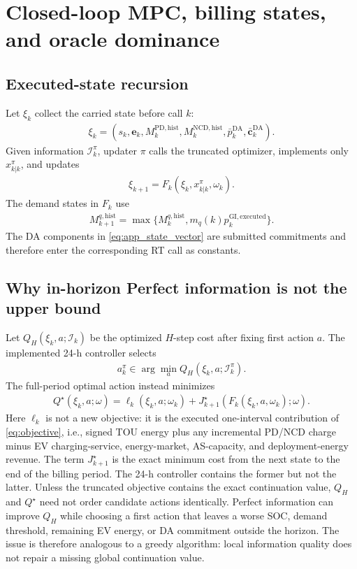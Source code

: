 \documentclass[final,5p,times]{elsarticle}
\newcommand{\DA}{\mathrm{DA}}
\newcommand{\GI}{\mathrm{GI}}
\newcommand{\PD}{\mathrm{PD}}
\newcommand{\NCD}{\mathrm{NCD}}
\newcommand{\hist}{\mathrm{hist}}
\begin{document}
\section{Closed-loop MPC, billing states, and oracle dominance}
\label{app:closed_loop}

\subsection{Executed-state recursion}
Let $\xi_k$ collect the carried state before call $k$:
\begin{align}
\xi_k=\left(s_k,\boldsymbol{e}_k,M_k^{\PD,\hist},
M_k^{\NCD,\hist},\bar p_k^{\DA},\bar{\boldsymbol c}_k^{\DA}\right).
\label{eq:app_state_vector}
\end{align}
Given information $\mathcal{I}_k^\pi$, updater $\pi$ calls the truncated optimizer,
implements only $x_{k|k}^\pi$, and updates
\begin{align}
\xi_{k+1}=F_k(\xi_k,x_{k|k}^\pi,\omega_k). \label{eq:app_state_recursion}
\end{align}
The demand states in $F_k$ use
\begin{align}
M_{k+1}^{q,\hist}
=\max\{M_k^{q,\hist},m_q(k)p_k^{\GI,\mathrm{executed}}\}. \label{eq:app_threshold_recursion}
\end{align}
The DA components in \eqref{eq:app_state_vector} are submitted commitments and
therefore enter the corresponding RT call as constants.

\subsection{Why in-horizon Perfect information is not the upper bound}
Let $Q_H(\xi_k,a;\mathcal{I}_k)$ be the optimized $H$-step cost after fixing
first action $a$. The implemented 24-h controller selects
\begin{align}
a_k^\pi\in\arg\min_a Q_H(\xi_k,a;\mathcal{I}_k^\pi). \label{eq:app_truncated_action}
\end{align}
The full-period optimal action instead minimizes
\begin{align}
Q^\star(\xi_k,a;\omega)
=\ell_k(\xi_k,a;\omega_k)+J_{k+1}^\star(F_k(\xi_k,a,\omega_k);\omega).
\label{eq:app_true_q}
\end{align}
Here $\ell_k$ is not a new objective: it is the executed one-interval
contribution of \eqref{eq:objective}, i.e., signed TOU energy plus any
incremental PD/NCD charge minus EV charging-service, energy-market, AS-capacity,
and deployment-energy revenue. The term $J_{k+1}^\star$ is the exact minimum
cost from the next state to the end of the billing period. The 24-h controller
contains the former but not the latter.
Unless the truncated objective contains the exact continuation value,
$Q_H$ and $Q^\star$ need not order candidate actions identically. Perfect
information can improve $Q_H$ while choosing a first action that leaves a worse
SOC, demand threshold, remaining EV energy, or DA commitment outside the
horizon. The issue is therefore analogous to a greedy algorithm: local
information quality does not repair a missing global continuation value.
\end{document}
